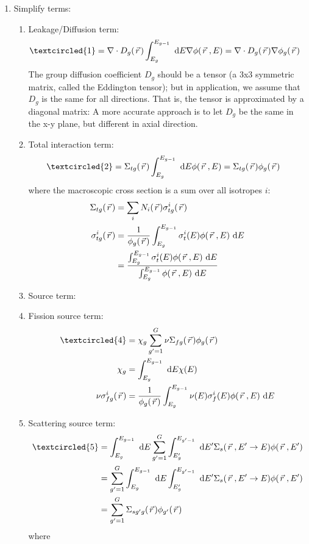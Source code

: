 \documentclass{school-22.211-notes}
\begin{document}
\begin{enumerate}
\item Simplify terms: 
  \begin{enumerate}
  \item Leakage/Diffusion term: 
    \begin{align}
      \textcircled{1} &= \divergence D_g(\vecr) \int_{E_g}^{E_{g-1}} \dE \gradient \phi(\vecr, E) = \divergence D_g (\vecr) \gradient \phi_g(\vecr) 
    \end{align}
    The group diffusion coefficient $D_g$ should be a tensor (a 3x3 symmetric matrix, called the Eddington tensor); but in application, we assume that $D_g$ is the same for all directions. That is, the tensor is approximated by a diagonal matrix: 
    A more accurate approach is to let $D_g$ be the same in the x-y plane, but different in axial direction. 
  \item Total interaction term: 
    \begin{align}
      \textcircled{2} &= \Sigma_{tg}(\vecr) \int_{E_g}^{E_{g-1}} \dE \phi(\vecr, E) = \Sigma_{tg} (\vecr) \phi_g(\vecr) 
    \end{align}
    where the macroscopic cross section is a sum over all isotropes $i$:
    \begin{align}
      \Sigma_{tg}(\left.\vec{r}\right.) &= \displaystyle\sum_{i} N_i(\left.\vec{r}\right.) \sigma_{tg}^i (\left.\vec{r}\right.) \\
      \sigma_{tg}^i (\left.\vec{r}\right.) &= \frac{1}{\phi_g(\left.\vec{r}\right.)} \int_{E_g}^{E_{g-1}} \sigma_t^i (E) \phi(\left.\vec{r}\right., E) \mbox{ }\mathrm{d} E \\
      &= \frac{\int_{E_g}^{E_{g-1}} \sigma_t^i (E) \phi(\left.\vec{r}\right., E) \mbox{ }\mathrm{d} E }{\int_{E_g}^{E_{g-1}} \phi(\left.\vec{r}\right., E) \mbox{ }\mathrm{d} E}
    \end{align}
  \item Source term: 
  \item Fission source term: 
    \begin{align}
      \textcircled{4} &= \chi_g \Sum_{g'=1}^G \nu \Sigma_{fg} (\vecr) \phi_g(\vecr) \\
      \chi_g &= \int_{E_g}^{E_{g-1}} \dE \chi(E) \\
      \nu \sigma_{fg}^i (\vecr) &= \frac{1}{\phi_g(\vecr)} \int_{E_g}^{E_{g-1}} \nu(E) \sigma_f^i (E) \phi(\vecr, E) \dE 
    \end{align}
  \item Scattering source term: 
  \begin{align}
    \textcircled{5} &= \int_{E_g}^{E_{g-1}} \dE \Sum_{g'=1}^G \int_{E_g'}^{E_{g'-1}} \dE' \Sigma_s(\vecr, E'\to E) \phi(\vecr, E') \\
    &= \Sum_{g'=1}^G \int_{E_g}^{E_{g-1}} \dE \int_{E_g'}^{E_{g'-1}} \dE' \Sigma_s(\vecr, E'\to E) \phi(\vecr, E') \\
    &= \Sum_{g'=1}^G \Sigma_{sg'g} (\vecr) \phi_{g'} (\vecr) 
  \end{align}
  where


\end{enumerate}
\end{enumerate}
\end{document}
